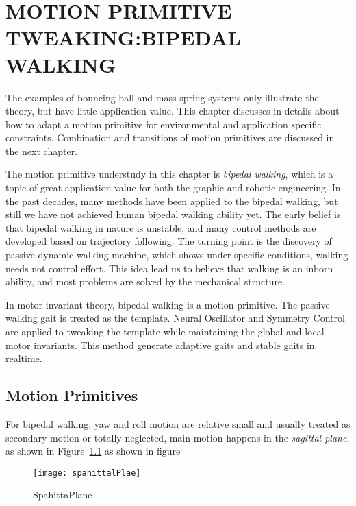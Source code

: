 \chapter{MOTION PRIMITIVE TWEAKING:BIPEDAL WALKING}
\label{chap:walk}
\graphicspath{{BipedWalk/BipedWalkFigs/EPS/}{BipedWalk/BipedWalkFigs/}}


The examples of bouncing ball and mass spring systems only illustrate the theory, but have little application value.
This chapter discusses in details about how to adapt a motion primitive for  environmental and application specific constraints.
Combination and transitions of motion primitives are discussed in the next chapter.


The motion primitive understudy in this chapter is \emph{bipedal walking}, which is a topic of great application value for both the graphic and robotic engineering.
In the past decades, many methods have been applied to the bipedal walking, but still we have not achieved  human bipedal walking ability yet.
The early belief is that bipedal walking in nature is unstable, and many control methods are developed based on trajectory following.
The turning point is the discovery of passive dynamic walking machine, which shows under specific conditions, walking needs not control effort.
This idea lead us to believe that walking is an inborn ability, and most problems are solved by the mechanical structure.

In motor invariant theory, bipedal walking is  a motion primitive.
The passive walking gait is treated as the template.
Neural Oscillator and Symmetry Control are applied to tweaking the template while maintaining the global and local motor invariants.
This method generate adaptive gaits and stable gaits in realtime.




\section{Motion Primitives}


For bipedal walking, yaw and roll motion are relative small and usually treated as secondary motion or totally neglected,  main motion happens in the \emph{sagittal plane}, as shown in Figure~\ref{fig:passivekneewalker}
as shown in figure
\begin{figure}[!htbp]
  \begin{center}
    \texttt{[image: spahittalPlae]}
    \caption{SpahittaPlane}
    \label{fig:passivekneewalker}
\end{center}
\end{figure}




